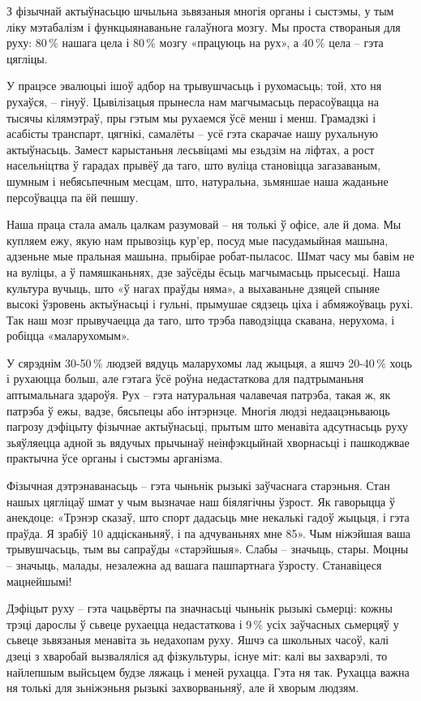 З фізычнай актыўнасьцю шчыльна зьвязаныя многія органы і сыстэмы, у тым ліку мэтабалізм і функцыянаваньне галаўнога мозгу. Мы проста створаныя для руху: 80\,\% нашага цела і 80\,\% мозгу «працуюць на рух», а 40\,\% цела – гэта цягліцы.

У працэсе эвалюцыі ішоў адбор на трывушчасьць і рухомасьць; той, хто ня рухаўся, – гінуў. Цывілізацыя прынесла нам магчымасьць перасоўвацца на тысячы кілямэтраў, пры гэтым мы рухаемся ўсё менш і менш. Грамадзкі і асабісты транспарт, цягнікі, самалёты – усё гэта скарачае нашу рухальную актыўнасьць. Замест карыстаньня лесьвіцамі мы езьдзім на ліфтах, а рост насельніцтва ў гарадах прывёў да таго, што вуліца становіцца загазаваным, шумным і небясьпечным месцам, што, натуральна, зьмяншае наша жаданьне персоўвацца па ёй пешшу.

Наша праца стала амаль цалкам разумовай – ня толькі ў офісе, але й дома. Мы купляем ежу, якую нам прывозіць кур'ер, посуд мые пасудамыйная машына, адзеньне мые пральная машына, прыбірае робат-пыласос. Шмат часу мы бавім не на вуліцы, а ў памяшканьнях, дзе заўсёды ёсьць магчымасьць прысесьці. Наша культура вучыць, што «ў нагах праўды няма», а выхаваньне дзяцей спыняе высокі ўзровень актыўнасьці і гульні, прымушае сядзець ціха і абмяжоўваць рухі. Так наш мозг прывучаецца да таго, што трэба паводзіцца скавана, нерухома, і робіцца «маларухомым».

У сярэднім 30-50\,\% людзей вядуць маларухомы лад жыцьця, а яшчэ 20-40\,\% хоць і рухаюцца больш, але гэтага ўсё роўна недастаткова для падтрыманьня аптымальнага здароўя. Рух – гэта натуральная чалавечая патрэба, такая ж, як патрэба ў ежы, вадзе, бясьпецы або інтэрнэце. Многія людзі недаацэньваюць пагрозу дэфіцыту фізычнае актыўнасьці, прытым што менавіта адсутнасьць руху зьяўляецца адной зь вядучых прычынаў неінфэкцыйнай хворнасьці і пашкоджвае практычна ўсе органы і сыстэмы арганізма.

Фізычная дэтрэнаванасьць – гэта чыньнік рызыкі заўчаснага старэньня. Стан нашых цягліцаў шмат у чым вызначае наш біялягічны ўзрост. Як гаворыцца ў анекдоце: «Трэнэр сказаў, што спорт дадасьць мне некалькі гадоў жыцьця, і гэта праўда. Я зрабіў 10 адцісканьняў, і па адчуваньнях мне 85». Чым ніжэйшая ваша трывушчасьць, тым вы сапраўды «старэйшыя». Слабы – значыць, стары. Моцны – значыць, малады, незалежна ад вашага пашпартнага ўзросту. Станавіцеся мацнейшымі!

Дэфіцыт руху – гэта чацьвёрты па значнасьці чыньнік рызыкі сьмерці: кожны трэці дарослы ў сьвеце рухаецца недастаткова і 9\,\% усіх заўчасных сьмерцяў у сьвеце зьвязаныя менавіта зь недахопам руху. Яшчэ са школьных часоў, калі дзеці з хваробай вызваляліся ад фізкультуры, існуе міт: калі вы захварэлі, то найлепшым выйсьцем будзе ляжаць і меней рухацца. Гэта ня так. Рухацца важна ня толькі для зьніжэньня рызыкі захворваньняў, але й хворым людзям.

